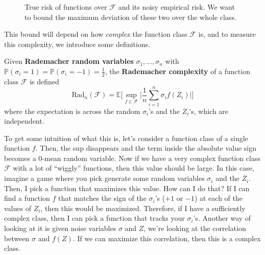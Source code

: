 \documentclass{article}
\begin{document}
  \begin{figure}[H]
    \centering 
    \caption{True risk of functions over $\mathcal{F}$ and its noisy empirical risk. We want to bound the maximum deviation of these two over the whole class.} 
    \label{fig:true_vs_empirical_risk}
  \end{figure}

  This bound will depend on how \textit{complex} the function class $\mathcal{F}$ is, and to measure this complexity, we introduce some definitions. 

  \begin{definition}
    Given \textbf{Rademacher random variables} $\sigma_1, \ldots, \sigma_n$ with $\mathbb{P}(\sigma_i = 1) = \mathbb{P}(\sigma_i = -1) = \frac{1}{2}$, the \textbf{Rademacher complexity} of a function class $\mathcal{F}$ is defined 
    \begin{equation}
      \mathrm{Rad}_n (\mathcal{F}) = \mathbb{E} \bigg[ \sup_{f \in \mathcal{F}} \bigg| \frac{1}{n} \sum_{i=1}^n \sigma_i f(Z_i) \bigg| \bigg]
    \end{equation}
    where the expectation is across the random $\sigma_i$'s and the $Z_i$'s, which are independent. 
  \end{definition}

  To get some intuition of what this is, let's consider a function class of a single function $f$. Then, the sup disappears and the term inside the absolute value sign becomes a $0$-mean random variable. Now if we have a very complex function class $\mathcal{F}$ with a lot of ``wiggly'' functions, then this value should be large. In this case, imagine a game where you pick generate some random variables $\sigma_i$ and the $Z_i$. Then, I pick a function that maximizes this value. How can I do that? If I can find a function $f$ that matches the sign of the $\sigma_i$'s ($+1$ or $-1$) at each of the values of $Z_i$, then this would be maximized. Therefore, if I have a sufficiently complex class, then I can pick a function that tracks your $\sigma_i$'s. Another way of looking at it is given noise variables $\sigma$ and $Z$, we're looking at the correlation between $\sigma$ and $f(Z)$. If we can maximize this correlation, then this is a complex class. 
\end{document}

